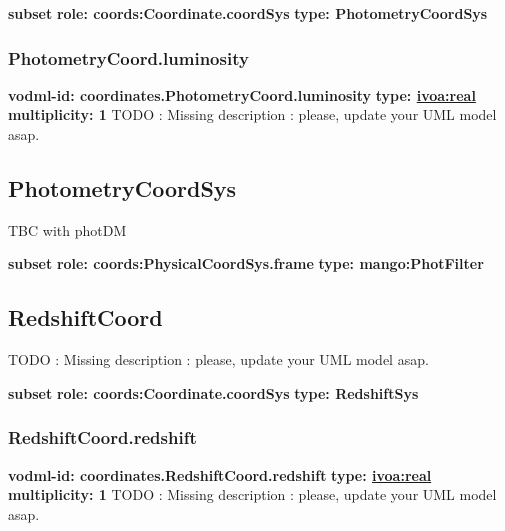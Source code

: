     \noindent \textbf{subset} \newline
    \indent   \textbf{role: coords:Coordinate.coordSys} \newline
    \indent   \textbf{type: PhotometryCoordSys} \newline


    \subsubsection{PhotometryCoord.luminosity}
      \textbf{vodml-id: coordinates.PhotometryCoord.luminosity} \newline
      \textbf{type: \hyperref[sect:ivoa]{ivoa:real}} \newline
      \textbf{multiplicity: 1} \newline 
      TODO : Missing description : please, update your UML model asap.

  \subsection{PhotometryCoordSys}
  \label{sect:coordinates.PhotometryCoordSys}
    TBC with photDM

    \noindent \textbf{subset} \newline
    \indent   \textbf{role: coords:PhysicalCoordSys.frame} \newline
    \indent   \textbf{type: mango:PhotFilter} \newline


  \subsection{RedshiftCoord}
  \label{sect:coordinates.RedshiftCoord}
    TODO : Missing description : please, update your UML model asap.

    \noindent \textbf{subset} \newline
    \indent   \textbf{role: coords:Coordinate.coordSys} \newline
    \indent   \textbf{type: RedshiftSys} \newline


    \subsubsection{RedshiftCoord.redshift}
      \textbf{vodml-id: coordinates.RedshiftCoord.redshift} \newline
      \textbf{type: \hyperref[sect:ivoa]{ivoa:real}} \newline
      \textbf{multiplicity: 1} \newline 
      TODO : Missing description : please, update your UML model asap.

